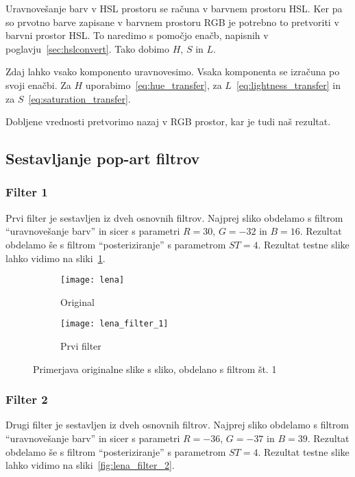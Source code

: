 Uravnovešanje barv v HSL prostoru se računa v barvnem prostoru HSL. Ker pa so
prvotno barve zapisane v barvnem prostoru RGB je potrebno to pretvoriti v
barvni prostor HSL. To naredimo s pomočjo enačb, napisnih v
poglavju~\ref{sec:hslconvert}. Tako dobimo $H$, $S$ in $L$.

Zdaj lahko vsako komponento uravnovesimo. Vsaka komponenta se izračuna po
svoji enačbi. Za $H$ uporabimo~\eqref{eq:hue_transfer}, za
$L$~\eqref{eq:lightness_transfer} in za $S$~\eqref{eq:saturation_transfer}.

Dobljene vrednosti pretvorimo nazaj v RGB prostor, kar je tudi naš rezultat.


\subsection{Sestavljanje pop-art filtrov}
\label{sec:obdelavaSlikSestavljanjePopArt}

\subsubsection*{Filter 1}
Prvi filter je sestavljen iz dveh osnovnih filtrov. Najprej sliko obdelamo s
filtrom ``uravnovešanje barv'' in sicer s parametri $R = 30$, $G = -32$ in
$B = 16$. Rezultat obdelamo še s filtrom ``posteriziranje'' s parametrom
$ST =4$. Rezultat testne slike lahko vidimo na sliki~\ref{fig:lena_filter_1}.

\begin{figure}[!ht]
    \centering
    \begin{subfigure}[b]{0.4\textwidth}
        \texttt{[image: lena]}
        \caption{Original}
    \end{subfigure}
    \begin{subfigure}[b]{0.4\textwidth}
        \texttt{[image: lena\_filter\_1]}
        \caption{Prvi filter}
    \end{subfigure}
    \caption{Primerjava originalne slike s sliko, obdelano s filtrom št. 1}
    \label{fig:lena_filter_1}
\end{figure}


\subsubsection*{Filter 2}
Drugi filter je sestavljen iz dveh osnovnih filtrov. Najprej sliko obdelamo s
filtrom ``uravnovešanje barv'' in sicer s parametri $R = -36$, $G = -37$ in
$B = 39$. Rezultat obdelamo še s filtrom ``posteriziranje'' s parametrom
$ST = 4$. Rezultat testne slike lahko vidimo na sliki~\ref{fig:lena_filter_2}.

